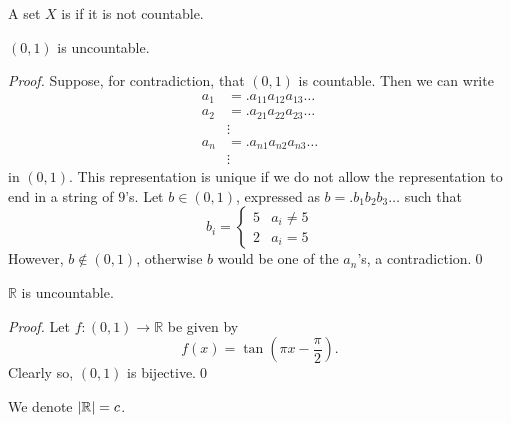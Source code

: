 \documentclass[notoc,notitlepage]{tufte-book}
\begin{document}
\begin{defn}[Uncountable]\label{defn:uncountable}
  A set $X$ is  if it is not countable.
\end{defn}

\begin{thm}\label{thm:cantor_s_diagonal_argument}
  $(0, 1)$ is uncountable.
\end{thm}

\begin{proof}
  Suppose, for contradiction, that $(0, 1)$ is countable. Then we can write
  \begin{align*}
    a_1 &=.a_{11} a_{12} a_{13} \ldots \\
    a_2 &=.a_{21} a_{22} a_{23} \ldots \\
        &\vdots \\
    a_n &=.a_{n1} a_{n2} a_{n3} \ldots \\
        &\vdots
  \end{align*}
  in $(0, 1)$. This representation is unique if we do not allow the representation to end in a string of $9$'s. Let $b \in (0, 1)$, expressed as $b =. b_1 b_2 b_3 \ldots$ such that
  \begin{equation*}
    b_i = \begin{cases}
      5 & a_i \neq 5 \\
      2 & a_i = 5
    \end{cases}
  \end{equation*}
  However, $b \notin (0, 1)$, otherwise $b$ would be one of the $a_n$'s, a contradiction.\qed
\end{proof}

\begin{crly}\label{crly:uncountability_of_r}
  $\mathbb{R}$ is uncountable.
\end{crly}

\begin{proof}
  Let $f : (0, 1) \to \mathbb{R}$ be given by
  \begin{equation*}
    f(x) = \tan \left( \pi x - \frac{\pi}{2} \right).
  \end{equation*}
  Clearly so, $(0, 1)$ is bijective.\qed
\end{proof}

\begin{note}
  We denote $\left|\mathbb{R}\right| = c$.
\end{note}
\end{document}
